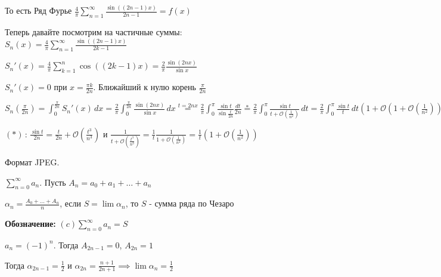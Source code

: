\begin{example}
\begin{enumerate}
{            То есть Ряд Фурье $\frac{4}{\pi} \sum\limits_{n = 1}^\infty \frac{\sin ((2n - 1)x)}{2n - 1} = f(x)$

            Теперь давайте посмотрим на частичные суммы: $S_n (x) = \frac{4}{\pi} \sum\limits_{n = 1}^\infty \frac{\sin ((2n - 1)x)}{2k - 1}$

            $S_n' (x) = \frac{4}{\pi} \sum\limits_{k = 1}^n \cos ((2k - 1)x) = \frac{2}{\pi} \frac{\sin (2 n x)}{\sin x}$

            $S_n' (x) = 0$ при $x = \frac{\pi k}{2n}$. Ближайший к нулю корень $\frac{\pi}{2n}$

            $S_n (\frac{\pi}{2n}) = \int_0^{\frac{\pi}{2n}} S_n'(x) \, dx = \frac{2}{\pi} \int_0^{\frac{\pi}{2n}} \frac{\sin (2 n x)}{\sin x} \, dx \overset{t = 2nx}{=} \frac{2}{\pi} \int_0^{\pi} \frac{\sin t}{\sin \frac{t}{2n}} \frac{dt}{2n}
            \overset{*}{=} \frac{2}{\pi} \int_0^\pi \frac{\sin t}{t + \mathcal{O}(\frac{1}{n^2})} \, dt = \frac{2}{\pi} \int_0^\pi \frac{\sin t}{t} \, dt (1 + \mathcal{O} (1 + \mathcal{O} (\frac{1}{n^2})))$

            $(*) \, : \, \frac{\sin t}{2n} = \frac{t}{2n} + \mathcal{O}(\frac{t^3}{n^3})$ и $\frac{1}{t + \mathcal{O} (\frac{t^3}{n^3})} = \frac{1}{t} \frac{1}{1 + \mathcal{O} (\frac{1}{n^2})} = \frac{1}{t} (1 + \mathcal{O} (\frac{1}{n^2}))$
        }
    \end{enumerate}
\end{example}

\begin{remark}
    Формат JPEG.

\end{remark}


\begin{definition}
    $\sum\limits_{n = 0}^\infty a_n$. Пусть $A_n = a_0 + a_1 + \ldots + a_n$

    $\alpha_n = \frac{A_0 + \ldots + A_n}{n}$, если $S = \lim \alpha_n$, то $S$ - сумма ряда по Чезаро

    \textbf{Обозначение: } $(c) \sum\limits_{n = 0}^\infty a_n = S$
\end{definition}

\begin{example}
    $a_n = (-1)^n$. Тогда $A_{2n-1} = 0$, $A_{2n} = 1$

    Тогда $\alpha_{2n - 1} = \frac{1}{2}$ и $\alpha_{2n} = \frac{n + 1}{2n + 1} \implies \lim \alpha_n = \frac{1}{2}$
\end{example}

